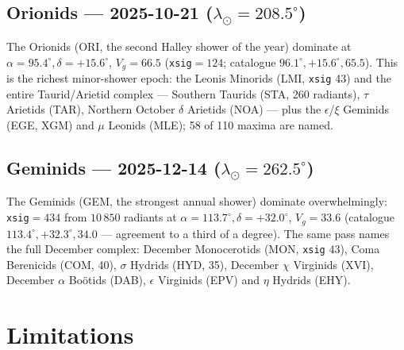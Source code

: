 \documentclass[11pt]{article}
\begin{document}

\subsection{Orionids --- 2025-10-21 ($\lambda_\odot=208.5^\circ$)}
The Orionids (ORI, the second Halley shower of the year) dominate at
$\alpha=95.4^\circ,\delta=+15.6^\circ$, $V_g=66.5$ (\texttt{xsig}${}=124$;
catalogue $96.1^\circ, +15.6^\circ, 65.5$). This is the richest minor-shower
epoch: the Leonis Minorids (LMI, \texttt{xsig} 43) and the entire Taurid/Arietid
complex --- Southern Taurids (STA, 260 radiants), $\tau$ Arietids (TAR), Northern
October $\delta$ Arietids (NOA) --- plus the $\epsilon$/$\xi$ Geminids (EGE, XGM)
and $\mu$ Leonids (MLE); 58 of 110 maxima are named.


\subsection{Geminids --- 2025-12-14 ($\lambda_\odot=262.5^\circ$)}
\label{sec:gem}
The Geminids (GEM, the strongest annual shower) dominate overwhelmingly:
\texttt{xsig}${}=434$ from $10\,850$ radiants at $\alpha=113.7^\circ,
\delta=+32.0^\circ$, $V_g=33.6$ (catalogue $113.4^\circ, +32.3^\circ, 34.0$ ---
agreement to a third of a degree). The same pass names the full December complex:
December Monocerotids (MON, \texttt{xsig} 43), Coma Berenicids (COM, 40),
$\sigma$ Hydrids (HYD, 35), December $\chi$ Virginids (XVI), December $\alpha$
Bo\"otids (DAB), $\epsilon$ Virginids (EPV) and $\eta$ Hydrids (EHY).


\section{Limitations}
\label{sec:limits}
\end{document}
